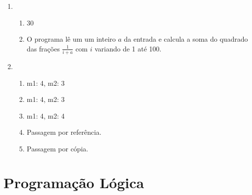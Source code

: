 \documentclass{article}
\begin{document}
\begin{enumerate}
\begin{enumerate}
        \end{enumerate}
        \item 
            \begin{enumerate}
                \item 30
                \item O programa lê um um inteiro $a$ da entrada e calcula a soma do quadrado das frações $ \frac{1}{i+a} $ com $i$ variando de 1 até 100.
            \end{enumerate}
        \item 
            \begin{enumerate}
                \item m1: 4, m2: 3
                \item m1: 4, m2: 3
                \item m1: 4, m2: 4
                \item Passagem por referência.
                \item Passagem por cópia.
            \end{enumerate}

    \end{enumerate}

    \section*{Programação Lógica}
\end{document}
